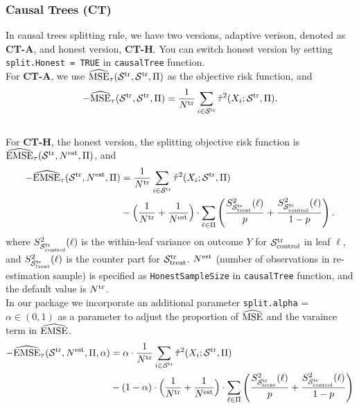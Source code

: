 \documentclass[11pt]{article}
\newcommand{\emse}{{\rm EMSE}}
\newcommand{\est}{{\rm est}}
\newcommand{\calp}{{\Pi}}
\newcommand{\cals}{{\cal S}}
\newcommand{\mse}{{\rm MSE}}
\newcommand{\control}{{\rm control}}
\newcommand{\treat}{{\rm treat}}
\newcommand{\train}{{\rm tr}}
\begin{document}
\subsubsection{Causal Trees (\textbf{CT})}
In causal trees splitting rule, we have two versions, adaptive verison, denoted as \textbf{CT-A}, and honest version, \textbf{CT-H}. You can switch honest version by setting \texttt{split.Honest = TRUE} in \texttt{causalTree} function. \\
For \textbf{CT-A}, we use $\widehat{\mse}_\tau(\cals^\train,\cals^\train,\calp)$ as the objective risk function, and
\[-\widehat{\mse}_\tau(\cals^\train,\cals^\train,\calp) = \frac{1}{N^\train}\sum_{i\in\cals^\train} \hat\tau^2(X_i;\cals^\train,\calp).\]
\\
For \textbf{CT-H}, the honest version, the splitting objective risk function is $\widehat{\emse}_\tau(\cals^\train, N^\est, \calp)$, and
\begin{align*}
-\widehat{\emse}_\tau(\cals^\train, N^\est, \calp) & = 
\frac{1}{N^\train}\sum_{i\in\cals^\train} \hat\tau^2(X_i;\cals^\train,\calp) \\
& -
\Bigl(\frac{1}{N^\train} + \frac{1}{N^\est}\Bigr)\cdot \sum_{\ell\in\calp}
\left( \frac{S^2_{\cals^\train_\treat}(\ell)}{p}+ \frac{S^2_{\cals^\train_\control}(\ell)}{1-p}\right).
\end{align*}
where $S^2_{\cals^\train_\control}(\ell)$ is the within-leaf variance on outcome $Y$ for $\cals^\train_\control$ in leaf $\ell$, and $S^2_{\cals^\train_\treat}(\ell)$ is the counter part for $\cals^\train_\treat$. $N^\est$ (number of observations in re-estimation sample) is specified as \texttt{HonestSampleSize} in \texttt{causalTree} function, and the default value is $N^\train$.\\
In our package we incorporate an additional parameter \texttt{split.alpha} = $\alpha \in (0, 1)$ as a parameter to adjust the proportion of $\widehat{\mse}$ and the varaince term in $\widehat{\emse}$.
\begin{align*}
-\widehat{\emse}_\tau(\cals^\train, N^\est, \calp, \alpha) &= 
\alpha \cdot \frac{1}{N^\train}\sum_{i\in\cals^\train} \hat\tau^2(X_i;\cals^\train,\calp) \\
& - (1 - \alpha) \cdot
\Bigl(\frac{1}{N^\train} + \frac{1}{N^\est}\Bigr) \cdot \sum_{\ell\in\calp}
\left( \frac{S^2_{\cals^\train_\treat}(\ell)}{p}+ \frac{S^2_{\cals^\train_\control}(\ell)}{1-p}\right)
\end{align*}
\end{document}
